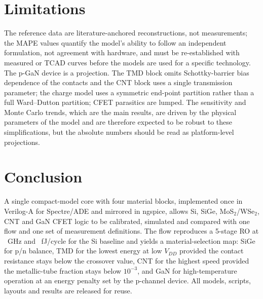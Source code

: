 \documentclass[journal]{IEEEtran}
\begin{document}
\section{Limitations}
The reference data are literature-anchored reconstructions, not measurements; the MAPE values quantify the model's ability to follow an independent formulation, not agreement with hardware, and must be re-established with measured or TCAD curves before the models are used for a specific technology. The p-GaN device is a projection. The TMD block omits Schottky-barrier bias dependence of the contacts and the CNT block uses a single transmission parameter; the charge model uses a symmetric end-point partition rather than a full Ward--Dutton partition; CFET parasitics are lumped. The sensitivity and Monte Carlo trends, which are the main results, are driven by the physical parameters of the model and are therefore expected to be robust to these simplifications, but the absolute numbers should be read as platform-level projections.

\section{Conclusion}
A single compact-model core with four material blocks, implemented once in Verilog-A for Spectre/ADE and mirrored in ngspice, allows Si, SiGe, MoS$_2$/WSe$_2$, CNT and GaN CFET logic to be calibrated, simulated and compared with one flow and one set of measurement definitions. The flow reproduces a 5-stage RO at \frosi~GHz and \ecycsi~fJ/cycle for the Si baseline and yields a material-selection map: SiGe for p/n balance, TMD for the lowest energy at low $V_{DD}$ provided the contact resistance stays below the crossover value, CNT for the highest speed provided the metallic-tube fraction stays below $10^{-3}$, and GaN for high-temperature operation at an energy penalty set by the p-channel device. All models, scripts, layouts and results are released for reuse.

\balance


\end{document}
